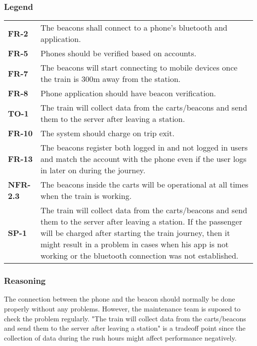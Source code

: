 \subsubsection{Legend}
{
  \renewcommand{\arraystretch}{1.4}
  \begin{table}[H]
    \centering
    \begin{tabularx}{\textwidth}{>{\bfseries}p{4cm}|X}
      FR-2 & The beacons shall connect to a phone's bluetooth and application. \\
      FR-5 & Phones should be verified based on accounts. \\
      FR-7 & The beacons will start connecting to mobile devices once the train is 300m away from the station.\\
      FR-8 & Phone application should have beacon verification.\\
      TO-1 & The train will collect data from the carts/beacons and send them to the server  after leaving a station.\\
      FR-10 & The system should charge on trip exit. \\
      FR-13 & The beacons register both logged in and not logged in users and match the account with the phone even if the user logs in later on during the journey.\\
      NFR-2.3 & The beacons inside the carts will be operational at all times when the train is working.\\
      SP-1 &  The train will collect data from the carts/beacons and send them to the server  after leaving a station. If the passenger will be  charged after starting the train journey, then it might result in a problem in cases when his app is not working or the bluetooth connection was not established.
      


    \end{tabularx}
  \end{table}
}

\subsubsection{Reasoning}


The connection between the phone and the beacon should normally be done properly without any problems. However, the maintenance team is suposed to check the problem regularly.  "The train will collect data from the carts/beacons and send them to the server  after leaving a station" is a tradeoff point since the collection of data during the rush hours might affect performance negatively.


